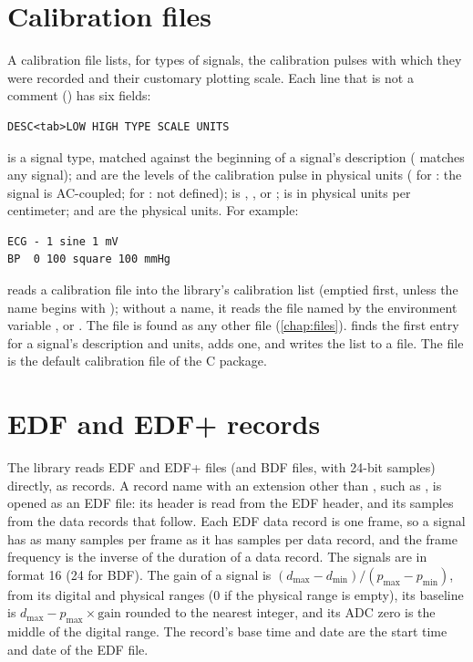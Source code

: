 \section{Calibration files}
\label{sec:calibration}

A calibration file lists, for types of signals, the calibration pulses with
which they were recorded and their customary plotting scale. Each line that
is not a comment (\code{\#}) has six fields:
\begin{lstlisting}[style=text]
DESC<tab>LOW HIGH TYPE SCALE UNITS
\end{lstlisting}
 is a signal type, matched against the beginning of a signal's
description (\code{*} matches any signal);  and  are
the levels of the calibration pulse in physical units (\code{-} for
: the signal is AC-coupled; \code{-} for : not
defined);  is , ,  or
;  is in physical units per centimeter; and
 are the physical units. For example:
\begin{lstlisting}[style=text]
ECG	- 1 sine 1 mV
BP	0 100 square 100 mmHg
\end{lstlisting}
 reads a calibration file into the library's
calibration list (emptied first, unless the name begins with \code{+});
without a name, it reads the file named by the environment variable
, or . The file is found as any other file
(\cref{chap:files}).  finds the first entry for a signal's
description and units,  adds one, and  writes the
list to a file. The file  is the default
calibration file of the C package.

\section{EDF and EDF+ records}
\label{sec:edf}

The library reads EDF and EDF+ files (and BDF files, with 24-bit samples)
directly, as records. A record name with an extension other than
, such as , is opened as an EDF file: its header
is read from the EDF header, and its samples from the data records that
follow. Each EDF data record is one frame, so a signal has as many samples
per frame as it has samples per data record, and the frame frequency is the
inverse of the duration of a data record. The signals are in format 16 (24
for BDF). The gain of a signal is
$(d_{\max} - d_{\min})/(p_{\max} - p_{\min})$, from its digital and physical
ranges (0 if the physical range is empty), its baseline is
$d_{\max} - p_{\max} \times \mathrm{gain}$ rounded to the nearest integer,
and its ADC zero is the middle of the digital range. The record's base time
and date are the start time and date of the EDF file.


